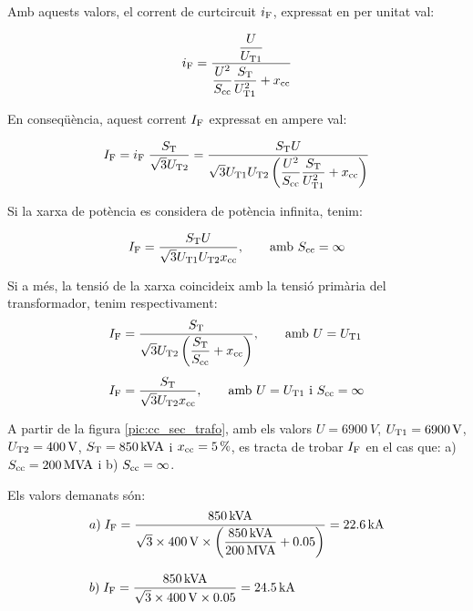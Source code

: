 Amb aquests valors, el corrent de curtcircuit $i_\mathrm{F}$, expressat
en per unitat val:

\begin{equation}
    i_\mathrm{F} = \frac{\dfrac{U}{U_\mathrm{T1}}}{\dfrac{U^2}{S_\mathrm{cc}}
    \dfrac{S_\mathrm{T}}{U_\mathrm{T1}^2} + x_\mathrm{cc}}
\end{equation}

En conseqüència, aquest corrent $I_\mathrm{F}$ expressat en ampere val:

\begin{equation}
    I_\mathrm{F} = i_\mathrm{F}\; \frac{S_\mathrm{T}}{\sqrt{3}U_\mathrm{T2}} =
    \frac{S_\mathrm{T} U}{\sqrt{3} U_\mathrm{T1}U_\mathrm{T2}
    \left(\dfrac{U^2}{S_\mathrm{cc}}
    \dfrac{S_\mathrm{T}}{U_\mathrm{T1}^2} + x_\mathrm{cc}\right)}
\end{equation}

Si la xarxa de potència es considera de potència infinita, tenim:

\begin{equation}
    I_\mathrm{F} = \frac{S_\mathrm{T} U}{\sqrt{3} U_\mathrm{T1}U_\mathrm{T2}
    x_\mathrm{cc}},\qquad \text{amb }S_\mathrm{cc}=\infty
\end{equation}

Si a més, la tensió de la xarxa coincideix amb la tensió primària
del transformador, tenim respectivament:
\begin{align}
    I_\mathrm{F} &= \frac{S_\mathrm{T}}{\sqrt{3} U_\mathrm{T2}
    \left(\dfrac{S_\mathrm{T}}{S_\mathrm{cc}} +
    x_\mathrm{cc}\right)},\qquad \text{amb }U=U_\mathrm{T1}\\[1ex]
    I_\mathrm{F} &= \frac{S_\mathrm{T}}{\sqrt{3} U_\mathrm{T2}
    x_\mathrm{cc}}, \qquad \text{amb }U=U_\mathrm{T1}\text{ i }
    S_\mathrm{cc}=\infty
\end{align}


\begin{exemple}[\CorrentCcSecTrafo{}]
	\addcontentsxms{\CorrentCcSecTrafo}
    A partir de la figura \vref{pic:cc_sec_trafo}, amb els valors
    $U=\qty{6900}{V}$, $U_\mathrm{T1}=\qty{6900}{V}$,
    $U_\mathrm{T2}=\qty{400}{V}$, $S_\mathrm{T}=\qty{850}{kVA}$ i
    $x_\mathrm{cc}=\qty{5}{\percent}$, es tracta de trobar $I_\mathrm{F}$ en el cas
    que: a) $S_\mathrm{cc}=\qty{200}{MVA}$ i b) $S_\mathrm{cc}=\infty$.

    Els valors demanats són:
    \begin{align*}
       &a)\;I_\mathrm{F} = \frac{\qty{850}{kVA}}{\sqrt{3}\times \qty{400}{V}\times
       \left(\dfrac{\qty{850}{kVA}}{\qty{200}{MVA}} +
       \num{0,05}\right)} = \qty{22,6}{kA} \\[2ex]
       &b)\;I_\mathrm{F} = \frac{\qty{850}{kVA}}{\sqrt{3}\times \qty{400}{V}\times
       \num{0,05}} = \qty{24,5}{kA}
    \end{align*}

\end{exemple}



